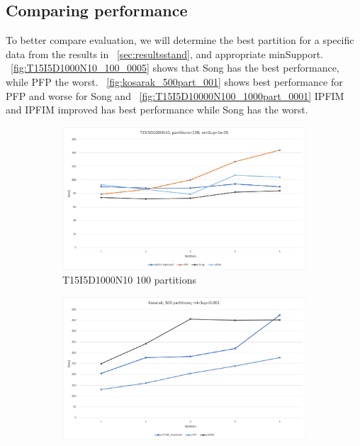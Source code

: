 \subsection{Comparing  performance}
To better compare evaluation, we will determine the best partition for a specific data from the results in ~\autoref{sec:resultsstand}, and appropriate minSupport.  ~\autoref{fig:T15I5D1000N10_100_0005} shows that Song has the best performance, while PFP the worst. ~\autoref{fig:kosarak_500part_001} shows best performance for PFP and worse for Song and ~\autoref{fig:T15I5D10000N100_1000part_0001} IPFIM and IPFIM improved has best performance while Song has the worst.

\begin{figure}[H]
  \centering
  \begin{subfigure}{\linewidth}
  \centering
  \includegraphics[width=\linewidth, height=\textheight, keepaspectratio]{figures/4iterations/T15I5D1000N10_100_0005}
  \caption{T15I5D1000N10 100 partitions}
  \label{fig:T15I5D1000N10_100_0005}
\end{subfigure}
  \begin{subfigure}{\linewidth}
  \centering
  \includegraphics[width=\linewidth ,height=\textheight, keepaspectratio]{figures/4iterations/kosarak_500part_001}

\end{subfigure}
\end{figure}
